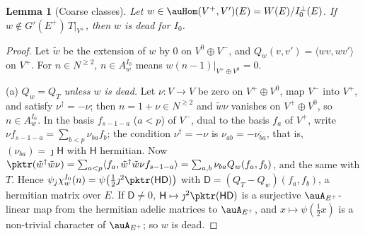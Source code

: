 \documentclass[10pt]{amsart}
\newtheorem{lemma}[theorem]{Lemma}
\theoremstyle{definition}
\theoremstyle{remark}
\providecommand{\aubar}[1]{\overline{#1}}
\begin{document}
\begin{lemma}[Coarse classes]\label{pk:coarse}
Let $w\in\auHom(V^+,V')(E)=W(E)/I_0^\perp(E)$. If $w\notin G'(E^+)\,T|_{V^+}$, then $w$ is dead
for $I_0$.
\end{lemma}
\begin{proof}
Let $\tilde w$ be the extension of $w$ by $0$ on $V^0\oplus V^-$, and $Q_w(v,v')=\langle wv,wv'
\rangle$ on $V^+$. For $n\in N^{\ge2}$, $n\in A^{I_0}_w$ means $w(n-1)|_{V^+\oplus V^0}=0$.

(a) \emph{$Q_w=Q_T$ unless $w$ is dead.} Let $\nu\colon V\to V$ be zero on $V^+\oplus V^0$, map
$V^-$ into $V^+$, and satisfy $\nu^\dagger=-\nu$; then $n=1+\nu\in N^{\ge2}$ and $\tilde w\nu$
vanishes on $V^+\oplus V^0$, so $n\in A^{I_0}_w$. In the basis $f_{s-1-a}$ ($a<p$) of $V^-$, dual
to the basis $f_a$ of $V^+$, write $\nu f_{s-1-a}=\sum_{b<p}\nu_{ba}f_b$; the condition
$\nu^\dagger=-\nu$ is $\nu_{ab}=-\aubar{\nu_{ba}}$, that is, $(\nu_{ba})=\jmath\mathsf H$ with
$\mathsf H$ hermitian. Now $\pktr(\tilde w^\dagger\tilde w\nu)=\sum_{a<p}\langle f_a,\tilde
w^\dagger\tilde w\nu f_{s-1-a}\rangle=\sum_{a,b}\nu_{ba}Q_w(f_a,f_b)$, and the same with $T$. Hence
$\psi_j\chi^{I_0}_w(n)=\psi\bigl(\tfrac12\jmath^2\pktr(\mathsf H\mathsf D)\bigr)$ with
$\mathsf D=(Q_T-Q_w)(f_a,f_b)$, a hermitian matrix over $E$. If $\mathsf D\ne0$, $\mathsf
H\mapsto\jmath^2\pktr(\mathsf H\mathsf D)$ is a surjective $\auA_{E^+}$-linear map from the
hermitian adelic matrices to $\auA_{E^+}$, and $x\mapsto\psi(\tfrac12x)$ is a non-trivial character
of $\auA_{E^+}$; so $w$ is dead.


\end{proof}
\end{document}

